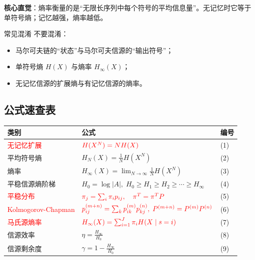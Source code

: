 \noindent \textbf{核心直觉}：熵率衡量的是“无限长序列中每个符号的平均信息量”。无记忆时它等于单符号熵；记忆越强，熵率越低。

\begin{warningBox}{常见混淆}
不要混淆：
\begin{itemize}
  \item 马尔可夫链的“状态”与马尔可夫信源的“输出符号”；
  \item 单符号熵 $H(X)$ 与熵率 $H_\infty(X)$；
  \item 无记忆信源的扩展熵与有记忆信源的熵率。
\end{itemize}
\end{warningBox}

\subsection{公式速查表}

{\scriptsize
\begin{tabularx}{\textwidth}{@{}l>{\raggedright\arraybackslash}X>{\raggedleft\arraybackslash}p{1.8em}@{}}
\toprule
\textbf{类别} & \textbf{公式} & \textbf{编号} \\
\midrule
\textcolor{Red}{无记忆扩展} & $\textcolor{Red}{H(X^N)=NH(X)}$ & (1) \\
平均符号熵 & $H_N(X)=\frac{1}{N}H(X^N)$ & (2) \\
熵率 & $H_\infty(X)=\lim_{N\to\infty}\frac{1}{N}H(X^N)$ & (3) \\
平稳信源熵阶梯 & $H_0=\log|A|,\; H_0\ge H_1\ge H_2\ge\cdots\ge H_\infty$ & (4) \\
\textcolor{Red}{平稳分布} & $\textcolor{Red}{\pi_j=\sum_i \pi_i p_{ij},\quad \pi^T=\pi^T P}$ & (5) \\
\textcolor{Red}{Kolmogorov-Chapman} & $\textcolor{Red}{p_{ij}^{(m+n)}=\sum_k p_{ik}^{(m)}p_{kj}^{(n)},\; P^{(m+n)}=P^{(m)}P^{(n)}}$ & (6) \\
\textcolor{Red}{马氏源熵率} & $\textcolor{Red}{H_\infty(X)=\sum_{i=1}^J\pi_i H(X\mid s=i)}$ & (7) \\
信源效率 & $\eta=\frac{H_\infty}{H_0}$ & (8) \\
信源剩余度 & $\gamma=1-\frac{H_\infty}{H_0}$ & (9) \\
\bottomrule
\end{tabularx}
}

